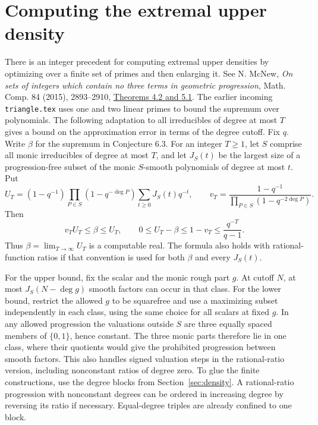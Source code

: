 \section{Computing the extremal upper density}
There is an integer precedent for computing extremal upper densities by
optimizing over a finite set of primes and then enlarging it.
See N. McNew, \emph{On sets of integers which contain no three terms in
geometric progression}, Math. Comp. 84 (2015), 2893--2910,
\href{https://arxiv.org/abs/1310.2277}{Theorems 4.2 and 5.1}.
The earlier incoming \texttt{triangle.tex} uses one and two linear primes
to bound the supremum over polynomials. The following adaptation to all
irreducibles of degree at most $T$ gives a bound on the approximation error
in terms of the degree cutoff.
Fix $q$. Write $\beta$ for the supremum in Conjecture 6.3.
For an integer $T\ge1$, let $S$ comprise all monic irreducibles of degree at
most $T$, and let $J_S(t)$ be the largest size of a progression-free subset
of the monic $S$-smooth polynomials of degree at most $t$. Put
\[
 U_T=(1-q^{-1})\prod_{P\in S}(1-q^{-\deg P})
              \sum_{t\ge0}J_S(t)q^{-t},\qquad
 v_T=\frac{1-q^{-1}}{\prod_{P\in S}(1-q^{-2\deg P})}.
\]
Then
\[
 v_T U_T\le\beta\le U_T,\qquad
 0\le U_T-\beta\le 1-v_T\le \frac{q^{-T}}{q-1}.
\]
Thus $\beta=\lim_{T\to\infty}U_T$ is a computable real. The formula
also holds with rational-function ratios if that convention is used for
both $\beta$ and every $J_S(t)$.

For the upper bound, fix the scalar and the monic rough part $g$.
At cutoff $N$, at most $J_S(N-\deg g)$ smooth factors can occur in that
class. For the lower bound, restrict the allowed $g$ to be squarefree
and use a maximizing subset independently in each class, using the same
choice for all scalars at fixed $g$. In any allowed progression the valuations
outside $S$ are three equally spaced members of $\{0,1\}$, hence constant.
The three monic parts therefore lie in one class, where their quotients
would give the prohibited progression between smooth factors. This also
handles signed valuation steps in the rational-ratio version, including
nonconstant ratios of degree zero. To glue the finite constructions,
use the degree blocks from Section~\ref{sec:density}. A rational-ratio
progression with nonconstant degrees can be ordered in increasing degree
by reversing its ratio if necessary. Equal-degree triples are already
confined to one block.

